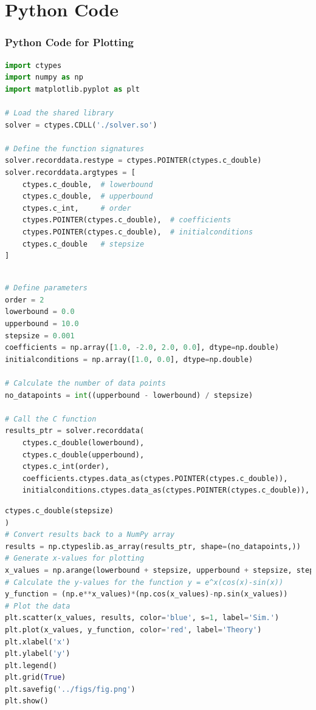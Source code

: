 \documentclass{beamer}
\theoremstyle{remark}
\numberwithin{equation}{section}
\begin{document}
\section{Python Code}
\begin{frame}[fragile]
\frametitle{Python Code for Plotting}
\begin{lstlisting}[language=Python]
import ctypes
import numpy as np
import matplotlib.pyplot as plt

# Load the shared library
solver = ctypes.CDLL('./solver.so')

# Define the function signatures
solver.recorddata.restype = ctypes.POINTER(ctypes.c_double)
solver.recorddata.argtypes = [
    ctypes.c_double,  # lowerbound
    ctypes.c_double,  # upperbound
    ctypes.c_int,     # order
    ctypes.POINTER(ctypes.c_double),  # coefficients
    ctypes.POINTER(ctypes.c_double),  # initialconditions
    ctypes.c_double   # stepsize
]

\end{lstlisting}
\end{frame}
\begin{frame}[fragile]
\begin{lstlisting}[language=Python]

# Define parameters
order = 2
lowerbound = 0.0
upperbound = 10.0
stepsize = 0.001
coefficients = np.array([1.0, -2.0, 2.0, 0.0], dtype=np.double) 
initialconditions = np.array([1.0, 0.0], dtype=np.double)

# Calculate the number of data points
no_datapoints = int((upperbound - lowerbound) / stepsize)

# Call the C function
results_ptr = solver.recorddata(
    ctypes.c_double(lowerbound),
    ctypes.c_double(upperbound),
    ctypes.c_int(order),
    coefficients.ctypes.data_as(ctypes.POINTER(ctypes.c_double)),
    initialconditions.ctypes.data_as(ctypes.POINTER(ctypes.c_double)),

\end{lstlisting}
\end{frame}
\begin{frame}[fragile]
\begin{lstlisting}[language=Python]
    ctypes.c_double(stepsize)
)
# Convert results back to a NumPy array
results = np.ctypeslib.as_array(results_ptr, shape=(no_datapoints,))
# Generate x-values for plotting
x_values = np.arange(lowerbound + stepsize, upperbound + stepsize, stepsize)
# Calculate the y-values for the function y = e^x(cos(x)-sin(x))
y_function = (np.e**x_values)*(np.cos(x_values)-np.sin(x_values))
# Plot the data
plt.scatter(x_values, results, color='blue', s=1, label='Sim.')
plt.plot(x_values, y_function, color='red', label='Theory')
plt.xlabel('x')
plt.ylabel('y')
plt.legend()
plt.grid(True)
plt.savefig('../figs/fig.png')
plt.show()
\end{lstlisting}
\end{frame}
\end{document}
